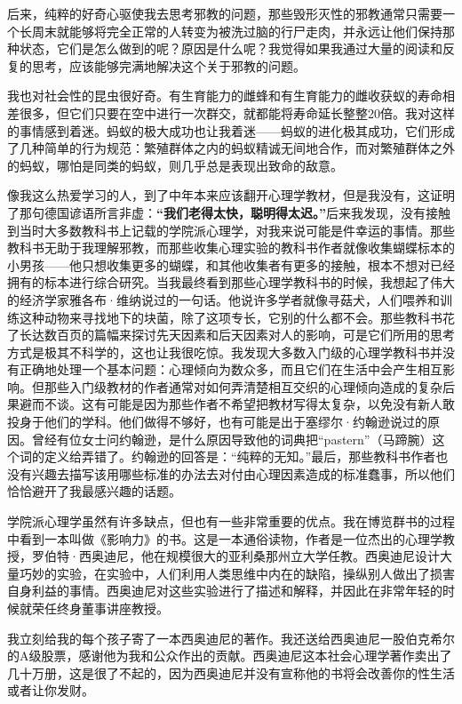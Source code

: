 后来，纯粹的好奇心驱使我去思考邪教的问题，那些毁形灭性的邪教通常只需要一个长周末就能够将完全正常的人转变为被洗过脑的行尸走肉，并永远让他们保持那种状态，它们是怎么做到的呢？原因是什么呢？我觉得如果我通过大量的阅读和反复的思考，应该能够完满地解决这个关于邪教的问题。
\par

我也对社会性的昆虫很好奇。有生育能力的雌蜂和有生育能力的雌收获蚁的寿命相差很多，但它们只要在空中进行一次群交，就都能将寿命延长整整20倍。我对这样的事情感到着迷。蚂蚁的极大成功也让我着迷——蚂蚁的进化极其成功，它们形成了几种简单的行为规范：繁殖群体之内的蚂蚁精诚无间地合作，而对繁殖群体之外的蚂蚁，哪怕是同类的蚂蚁，则几乎总是表现出致命的敌意。
\par

像我这么热爱学习的人，到了中年本来应该翻开心理学教材，但是我没有，这证明了那句德国谚语所言非虚：\textbf{“我们老得太快，聪明得太迟。”}后来我发现，没有接触到当时大多数教科书上记载的学院派心理学，对我来说可能是件幸运的事情。那些教科书无助于我理解邪教，而那些收集心理实验的教科书作者就像收集蝴蝶标本的小男孩——他只想收集更多的蝴蝶，和其他收集者有更多的接触，根本不想对已经拥有的标本进行综合研究。当我最终看到那些心理学教科书的时候，我想起了伟大的经济学家雅各布·维纳说过的一句话。他说许多学者就像寻菇犬，人们喂养和训练这种动物来寻找地下的块菌，除了这项专长，它别的什么都不会。那些教科书花了长达数百页的篇幅来探讨先天因素和后天因素对人的影响，可是它们所用的思考方式是极其不科学的，这也让我很吃惊。我发现大多数入门级的心理学教科书并没有正确地处理一个基本问题：心理倾向为数众多，而且它们在生活中会产生相互影响。但那些入门级教材的作者通常对如何弄清楚相互交织的心理倾向造成的复杂后果避而不谈。这有可能是因为那些作者不希望把教材写得太复杂，以免没有新人敢投身于他们的学科。他们做得不够好，也有可能是出于塞缪尔·约翰逊说过的原因。曾经有位女士问约翰逊，是什么原因导致他的词典把“pastern”（马蹄腕）这个词的定义给弄错了。约翰逊的回答是：“纯粹的无知。”最后，那些教科书作者也没有兴趣去描写该用哪些标准的办法去对付由心理因素造成的标准蠢事，所以他们恰恰避开了我最感兴趣的话题。
\par

学院派心理学虽然有许多缺点，但也有一些非常重要的优点。我在博览群书的过程中看到一本叫做《影响力》的书。这是一本通俗读物，作者是一位杰出的心理学教授，罗伯特·西奥迪尼，他在规模很大的亚利桑那州立大学任教。西奥迪尼设计大量巧妙的实验，在实验中，人们利用人类思维中内在的缺陷，操纵别人做出了损害自身利益的事情。西奥迪尼对这些实验进行了描述和解释，并因此在非常年轻的时候就荣任终身董事讲座教授。
\par

我立刻给我的每个孩子寄了一本西奥迪尼的著作。我还送给西奥迪尼一股伯克希尔的A级股票，感谢他为我和公众作出的贡献。西奥迪尼这本社会心理学著作卖出了几十万册，这是很了不起的，因为西奥迪尼并没有宣称他的书将会改善你的性生活或者让你发财。
\par

